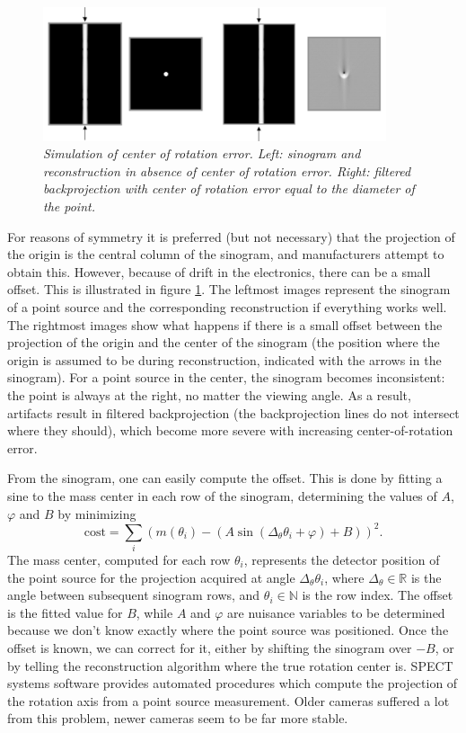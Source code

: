 \documentclass[11pt,oneside]{book}
\begin{document}
\begin{figure}[t]
\centering
\includegraphics[width=0.9\textwidth]{figs/fig_cor.pdf}
\caption{\label{fig:cor} \emph{Simulation of center of rotation error. Left:
sinogram and reconstruction in absence of center of rotation error. Right:
filtered backprojection with center of rotation error equal to the diameter of
the point.}}
\end{figure}
%
For reasons of symmetry it is preferred (but not necessary) that the
projection of the origin is the central column of the sinogram, and
manufacturers attempt to obtain this. However, because of drift in the
electronics, there can be a small offset. This is illustrated in figure
\ref{fig:cor}. The leftmost images represent the sinogram of a point source
and the corresponding reconstruction if everything works well. The rightmost
images show what happens if there is a small offset between the projection of
the origin and the center of the sinogram (the position where the origin is
assumed to be during reconstruction, indicated with the arrows in the
sinogram). For a point source in the center, the sinogram becomes
inconsistent: the point is always at the right, no matter the viewing
angle. As a result, artifacts result in filtered backprojection (the
backprojection lines do not intersect where they should), which become more
severe with increasing center-of-rotation error.

From the sinogram, one can easily compute the offset. This is done by
fitting a sine to the mass center in each row of the sinogram,
determining the values of $A$, $\varphi$ and $B$ by minimizing
\begin{equation}
 \mbox{cost} = 
  \sum_i \left(m(\theta_i) 
           - (A \sin(\Delta_\theta \theta_i + \varphi) + B)\right)^2.
\end{equation}
The mass center, computed for each row $\theta_i$, represents the
detector position of the point source for the projection acquired at
angle $\Delta_\theta \theta_i$, where $\Delta_\theta \in \mathbb{R}$ is the
angle between subsequent sinogram rows, and $\theta_i \in \mathbb{N}$ is the
row index. The offset is the fitted value for $B$, while $A$ and
$\varphi$ are nuisance variables to be determined because we don't
know exactly where the point source was positioned. Once the offset is
known, we can correct for it, either by shifting the sinogram over $-B$,
or by telling the reconstruction algorithm where the true rotation
center is. SPECT systems software provides automated procedures which
compute the projection of the rotation axis from a point source
measurement. Older cameras suffered a lot from this problem, newer
cameras seem to be far more stable.
\end{document}
